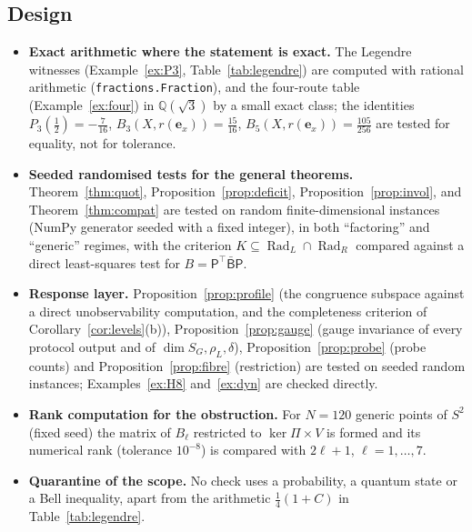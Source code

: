 \documentclass[11pt,a4paper]{article}
\newcommand{\Rad}{\operatorname{Rad}}
\newcommand{\defic}{\delta}
\theoremstyle{plain}
\theoremstyle{definition}
\begin{document}
\subsection{Design}
\begin{itemize}
\item \textbf{Exact arithmetic where the statement is exact.} The Legendre witnesses (Example~\ref{ex:P3}, Table~\ref{tab:legendre}) are computed with rational arithmetic (\texttt{fractions.Fraction}), and the four-route table (Example~\ref{ex:four}) in $\mathbb Q(\sqrt3)$ by a small exact class; the identities $P_3(\tfrac12)=-\tfrac7{16}$, $B_3(X,r(\mathbf e_x))=\tfrac{15}{16}$, $B_5(X,r(\mathbf e_x))=\tfrac{105}{256}$ are tested for equality, not for tolerance.
\item \textbf{Seeded randomised tests for the general theorems.} Theorem~\ref{thm:quot}, Proposition~\ref{prop:deficit}, Proposition~\ref{prop:invol}, and Theorem~\ref{thm:compat} are tested on random finite-dimensional instances (NumPy generator seeded with a fixed integer), in both ``factoring'' and ``generic'' regimes, with the criterion $K\subseteq\Rad_L\cap\Rad_R$ compared against a direct least-squares test for $B=\mathsf P^{\!\top}\bar{\mathsf B}\mathsf P$.
\item \textbf{Response layer.} Proposition~\ref{prop:profile} (the congruence subspace against a direct unobservability computation, and the completeness criterion of Corollary~\ref{cor:levels}(b)), Proposition~\ref{prop:gauge} (gauge invariance of every protocol output and of $\dim S_G,\rho_L,\defic$), Proposition~\ref{prop:probe} (probe counts) and Proposition~\ref{prop:fibre} (restriction) are tested on seeded random instances; Examples~\ref{ex:H8} and~\ref{ex:dyn} are checked directly.
\item \textbf{Rank computation for the obstruction.} For $N=120$ generic points of $S^2$ (fixed seed) the matrix of $B_\ell$ restricted to $\ker\Pi\times V$ is formed and its numerical rank (tolerance $10^{-8}$) is compared with $2\ell+1$, $\ell=1,\dots,7$.
\item \textbf{Quarantine of the scope.} No check uses a probability, a quantum state or a Bell inequality, apart from the arithmetic $\frac14(1+C)$ in Table~\ref{tab:legendre}.
\end{itemize}
\end{document}
